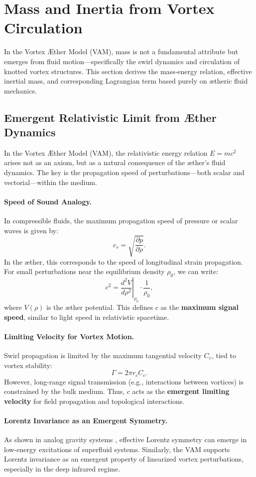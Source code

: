\section{Mass and Inertia from Vortex Circulation}

In the Vortex Æther Model (VAM), mass is not a fundamental attribute but emerges from fluid motion—specifically the swirl dynamics and circulation of knotted vortex structures. This section derives the mass-energy relation, effective inertial mass, and corresponding Lagrangian term based purely on ætheric fluid mechanics.

\subsection{Emergent Relativistic Limit from Æther Dynamics}

In the Vortex Æther Model (VAM), the relativistic energy relation \( E = mc^2 \) arises not as an axiom, but as a natural consequence of the æther's fluid dynamics. The key is the propagation speed of perturbations—both scalar and vectorial—within the medium.

\paragraph{Speed of Sound Analogy.}
In compressible fluids, the maximum propagation speed of pressure or scalar waves is given by:
\[
    c_s = \sqrt{\frac{\partial p}{\partial \rho}}.
\]
In the æther, this corresponds to the speed of longitudinal strain propagation. For small perturbations near the equilibrium density \( \rho_0 \), we can write:
\[
    c^2 = \left.\frac{d^2 V}{d\rho^2} \right|_{\rho_0} \cdot \frac{1}{\rho_0},
\]
where \( V(\rho) \) is the æther potential. This defines \( c \) as the \textbf{maximum signal speed}, similar to light speed in relativistic spacetime.

\paragraph{Limiting Velocity for Vortex Motion.}
Swirl propagation is limited by the maximum tangential velocity \( C_e \), tied to vortex stability:
\[
    \Gamma = 2\pi r_c C_e.
\]
However, long-range signal transmission (e.g., interactions between vortices) is constrained by the bulk medium. Thus, \( c \) acts as the \textbf{emergent limiting velocity} for field propagation and topological interactions.

\paragraph{Lorentz Invariance as an Emergent Symmetry.}
As shown in analog gravity systems \cite{barcelo2011}, effective Lorentz symmetry can emerge in low-energy excitations of superfluid systems. Similarly, the VAM supports Lorentz invariance as an emergent property of linearized vortex perturbations, especially in the deep infrared regime.

